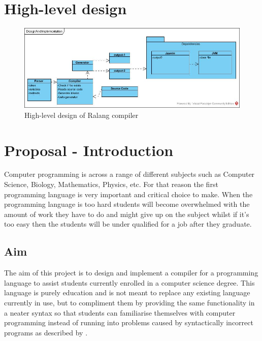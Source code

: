 \documentclass[a4paper]{article}
\begin{document}
\begin{appendices}
	\section{High-level design}
	\label{App:HighLevelDesign}
	\begin{figure}[h!]
		\centering
		\includegraphics[width=0.95\linewidth]{images/DesignAndImplementation}
		\caption[High level design of Ralang compiler]{High-level design of Ralang compiler}
		\label{fig:DesignAndImplementation}
	\end{figure}
	\pagebreak	
	\section{Proposal - Introduction}
	\label{App:ProposalIntro}
	Computer programming is across a range of different subjects such as Computer Science, Biology, Mathematics, Physics, etc. For that reason the first programming language is very important and critical choice to make. When the programming language is too hard students will become overwhelmed with the amount of work they have to do and might give up on the subject whilst if it's too easy then the students will be under qualified for a job after they graduate.
	
	\subsection{Aim}
	The aim of this project is to design and implement a compiler for a programming language to assist students currently enrolled in a computer science degree. This language is purely education and is not meant to replace any existing language currently in use, but to compliment them by providing the same functionality in a neater syntax so that students can familiarise themselves with computer programming instead of running into problems caused by syntactically incorrect programs as described by \textcite{KrpanBilobrk2011}.
	

\end{appendices}
\end{document}
